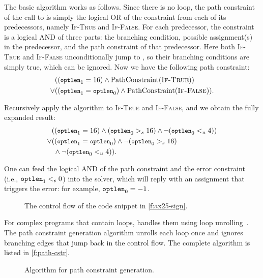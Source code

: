 The basic algorithm works as follows.  Since there is no loop, the
path constraint of the call to  is simply the
logical OR of the constraint from each of its predecessors, namely
\textsc{If-True} and \textsc{If-False}.  For each predecessor, the
constraint is a logical AND of three parts: the branching condition,
possible assignment(s) in the predecessor, and the path constraint
of that predecessor.  Here both \textsc{If-True} and \textsc{If-False}
unconditionally jump to , so their branching
conditions are simply true, which can be ignored.  Now we have the
following path constraint:
\newcommand{\optlen}{{\small \texttt{optlen}}}
\newcommand{\pc}{\textrm{PathConstraint}}
%
\begin{align*}
& ((\optlen_1 = 16) \land \pc(\textsc{If-True})) \\
\lor & ((\optlen_1 = \optlen_0) \land \pc(\textsc{If-False})).
\end{align*}

Recursively apply the algorithm to \textsc{If-True} and \textsc{If-False},
and we obtain the fully expanded result:
%
\begin{align*}
& ((\optlen_1 = 16) \land (\optlen_0 >_s 16)
    \land \neg(\optlen_0 <_u 4)) \\
\lor & ((\optlen_1 = \optlen_0) \land \neg(\optlen_0 >_s 16) \\
     & \; \land \neg(\optlen_0 <_u 4)).
\end{align*}

One can feed the logical AND of the path constraint and the error
constraint (i.e., $\texttt{optlen}_1 <_s 0$) into the solver, which
will reply with an assignment that triggers the error: for example,
$\texttt{optlen}_0 = -1$.

\begin{figure}
\centering
\resizebox{\linewidth}{!}{

}
\caption{The control flow of the code snippet in \autoref{f:ax25-sign}.}
\label{f:cfg}
\end{figure}

For complex programs that contain loops, \sys handles them using
loop unrolling~\cite{xie:saturn}.  The path
constraint generation algorithm unrolls each loop once and ignores
branching edges that jump back in the control flow.
The complete algorithm is listed in \autoref{f:path-cstr}.

\begin{figure}

\caption{Algorithm for path constraint generation.}
\label{f:path-cstr}
\end{figure}

